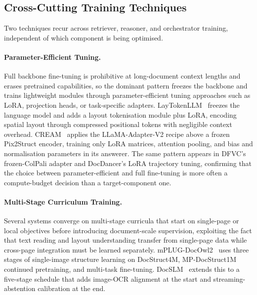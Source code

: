 \documentclass[11pt]{article}
\begin{document}
\subsection{Cross-Cutting Training Techniques}
\label{sec:train-crosscutting}

Two techniques recur across retriever, reasoner, and orchestrator training, independent of which component is being optimised.

\paragraph{Parameter-Efficient Tuning.} Full backbone fine-tuning is prohibitive at long-document context lengths and erases pretrained capabilities, so the dominant pattern freezes the backbone and trains lightweight modules through parameter-efficient tuning approaches such as LoRA, projection heads, or task-specific adapters. LayTokenLLM~\cite{zhu2025laytokenllm} freezes the language model and adds a layout tokenisation module plus LoRA, encoding spatial layout through compressed positional tokens with negligible context overhead. CREAM~\cite{zhang2024cream} applies the LLaMA-Adapter-V2 recipe above a frozen Pix2Struct encoder, training only LoRA matrices, attention pooling, and bias and normalisation parameters in its answerer. The same pattern appears in DFVC's frozen-ColPali adapter and DocDancer's LoRA trajectory tuning, confirming that the choice between parameter-efficient and full fine-tuning is more often a compute-budget decision than a target-component one.

\paragraph{Multi-Stage Curriculum Training.} Several systems converge on multi-stage curricula that start on single-page or local objectives before introducing document-scale supervision, exploiting the fact that text reading and layout understanding transfer from single-page data while cross-page integration must be learned separately. mPLUG-DocOwl2~\cite{hu2025mplugdocowl2} uses three stages of single-image structure learning on DocStruct4M, MP-DocStruct1M continued pretraining, and multi-task fine-tuning. DocSLM~\cite{hannan2025docslm} extends this to a five-stage schedule that adds image-OCR alignment at the start and streaming-abstention calibration at the end.
\end{document}

